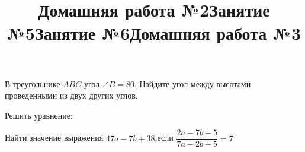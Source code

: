 \newpage
\title{Домашняя работа №2}
\begin{listofex}
	\item {}
	\item {}
	\item {}
	\item {}
	\item {}
	\item {}
	\item В треугольнике \( ABC \) угол \( \angle B = 80 \). Найдите угол между высотами проведенными из двух других углов. 
	\item Решить уравнение:
	\begin{enumcols}[itemcolumns=2]
		\item {}
		\item {}
	\end{enumcols}
\end{listofex}
\newpage
\title{Занятие №5}
\begin{listofex}
	\item {}
	\item {}
	\item {}
	\item {}
	\item {}
	\item {}
	\item {}
	\item {}
\end{listofex}
\newpage
\title{Занятие №6}
\begin{listofex}
	\item {}
	\item {}
	\item {}
	\item {}
	\item {}
	\item {}
	\item Найти значение выражения \( 47a-7b+38 \),\quad если \( \dfrac{2a-7b+5}{7a-2b+5}=7 \)
\end{listofex}
\newpage
\title{Домашняя работа №3}
\begin{listofex}
	\item {}
	\item {}
	\item {}
	\item {}
\end{listofex}
